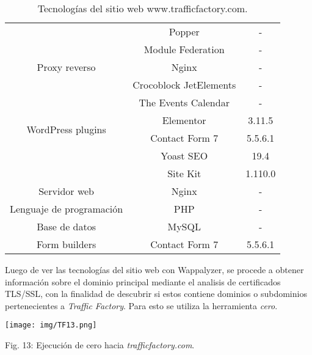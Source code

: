 \documentclass[12pt,oneside,a4paper]{book}
\begin{document}
\begin{table}[H]
\begin{tabular}{|c|c|c|}
        \cline{2-3}
        & Popper & - \\
        \cline{2-3}
        & Module Federation & - \\
        \hline
        Proxy reverso & Nginx & - \\
        \hline
        \multirow{6}{*}{WordPress plugins} & Crocoblock JetElements & - \\
        \cline{2-3}
        & The Events Calendar & - \\
        \cline{2-3}
        & Elementor & 3.11.5 \\
        \cline{2-3}
        & Contact Form 7 & 5.5.6.1 \\
        \cline{2-3}
        & Yoast SEO & 19.4 \\
        \cline{2-3}
        & Site Kit & 1.110.0\\
        \hline
        Servidor web & Nginx & - \\
        \hline
        Lenguaje de programación & PHP & - \\
        \hline
        Base de datos & MySQL & - \\
        \hline
        Form builders & Contact Form 7 & 5.5.6.1 \\
        \hline
    \end{tabular}
    \caption{Tecnologías del sitio web www.trafficfactory.com.}
    \label{tab:mylabel}
\end{table}

\vspace{1em}

\hspace{20pt}
Luego de ver las tecnologías del sitio web con Wappalyzer, se procede a obtener información sobre el dominio principal mediante el analisis de certificados TLS/SSL, con la finalidad de descubrir si estos contiene dominios o subdominios pertenecientes a \textit{Traffic Factory}. Para esto se utiliza la herramienta \textit{cero}.

\vspace{2em}

\begin{center}
	\texttt{[image: img/TF13.png]}
    
\vspace{0.1em}
    
    Fig. 13: Ejecución de cero hacia \textit{trafficfactory.com}.
\end{center}

\vspace{2em}
\end{document}
